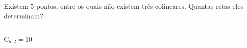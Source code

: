\begin{ex}
  Existem 5 pontos, entre os quais não existem três colineares. Quantas retas eles determinam?
    \begin{sol}
      \phantom{A} \\
      $\mathrm{C}_{5,2}=10$
    \end{sol}
\end{ex}